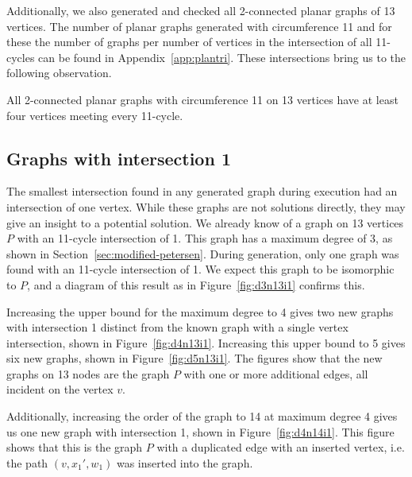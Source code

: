 Additionally, we also generated and checked all 2-connected planar graphs of 13 vertices. The number of planar graphs generated with circumference 11 and for these the number of graphs per number of vertices in the intersection of all 11-cycles can be found in Appendix~\ref{app:plantri}. These intersections bring us to the following observation.
\begin{observation}
  All 2-connected planar graphs with circumference 11 on 13 vertices have at least four vertices meeting every 11-cycle.
\end{observation}

\subsection{Graphs with intersection 1}

The smallest intersection found in any generated graph during execution had an intersection of one vertex. While these graphs are not solutions directly, they may give an insight to a potential solution. We already know of a graph on 13 vertices $P$ with an 11-cycle intersection of 1. This graph has a maximum degree of 3, as shown in Section~\ref{sec:modified-petersen}. During generation, only one graph was found with an 11-cycle intersection of 1. We expect this graph to be isomorphic to $P$, and a diagram of this result as in Figure~\ref{fig:d3n13i1} confirms this.

Increasing the upper bound for the maximum degree to 4 gives two new graphs with intersection 1 distinct from the known graph with a single vertex intersection, shown in Figure~\ref{fig:d4n13i1}. Increasing this upper bound to 5 gives six new graphs, shown in Figure~\ref{fig:d5n13i1}. The figures show that the new graphs on 13 nodes are the graph $P$ with one or more additional edges, all incident on the vertex $v$.

Additionally, increasing the order of the graph to 14 at maximum degree 4 gives us one new graph with intersection 1, shown in Figure~\ref{fig:d4n14i1}. This figure shows that this is the graph $P$ with a duplicated edge with an inserted vertex, i.e. the path $(v, x_1', w_1)$ was inserted into the graph.

